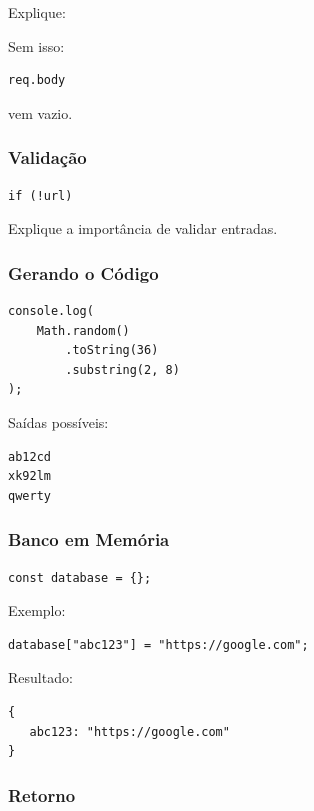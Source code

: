 \documentclass[a4paper,12pt]{article}
\begin{document}
Explique:

Sem isso:

\begin{verbatim}
req.body
\end{verbatim}

vem vazio.

\subsubsection{Validação}

\begin{verbatim}
if (!url)
\end{verbatim}

Explique a importância de validar entradas.

\subsubsection{Gerando o Código}

\begin{verbatim}
console.log(
    Math.random()
        .toString(36)
        .substring(2, 8)
);
\end{verbatim}

Saídas possíveis:

\begin{verbatim}
ab12cd
xk92lm
qwerty
\end{verbatim}

\subsubsection{Banco em Memória}

\begin{verbatim}
const database = {};
\end{verbatim}

Exemplo:

\begin{verbatim}
database["abc123"] = "https://google.com";
\end{verbatim}

Resultado:

\begin{verbatim}
{
   abc123: "https://google.com"
}
\end{verbatim}

\subsubsection{Retorno}
\end{document}
